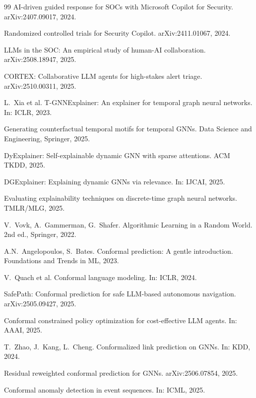 \documentclass[preprint,review,12pt]{elsarticle}
\begin{document}
\begin{thebibliography}{99}
 AI-driven guided response for SOCs with Microsoft Copilot for Security. arXiv:2407.09017, 2024.

 Randomized controlled trials for Security Copilot. arXiv:2411.01067, 2024.

 LLMs in the SOC: An empirical study of human-AI collaboration. arXiv:2508.18947, 2025.

 CORTEX: Collaborative LLM agents for high-stakes alert triage. arXiv:2510.00311, 2025.

 L.~Xia et al. T-GNNExplainer: An explainer for temporal graph neural networks. In: ICLR, 2023.

 Generating counterfactual temporal motifs for temporal GNNs. Data Science and Engineering, Springer, 2025.

 DyExplainer: Self-explainable dynamic GNN with sparse attentions. ACM TKDD, 2025.

 DGExplainer: Explaining dynamic GNNs via relevance. In: IJCAI, 2025.

 Evaluating explainability techniques on discrete-time graph neural networks. TMLR/MLG, 2025.

 V.~Vovk, A.~Gammerman, G.~Shafer. Algorithmic Learning in a Random World. 2nd ed., Springer, 2022.

 A.N.~Angelopoulos, S.~Bates. Conformal prediction: A gentle introduction. Foundations and Trends in ML, 2023.

 V.~Quach et al. Conformal language modeling. In: ICLR, 2024.

 SafePath: Conformal prediction for safe LLM-based autonomous navigation. arXiv:2505.09427, 2025.

 Conformal constrained policy optimization for cost-effective LLM agents. In: AAAI, 2025.

 T.~Zhao, J.~Kang, L.~Cheng. Conformalized link prediction on GNNs. In: KDD, 2024.

 Residual reweighted conformal prediction for GNNs. arXiv:2506.07854, 2025.

 Conformal anomaly detection in event sequences. In: ICML, 2025.


\end{thebibliography}
\end{document}
